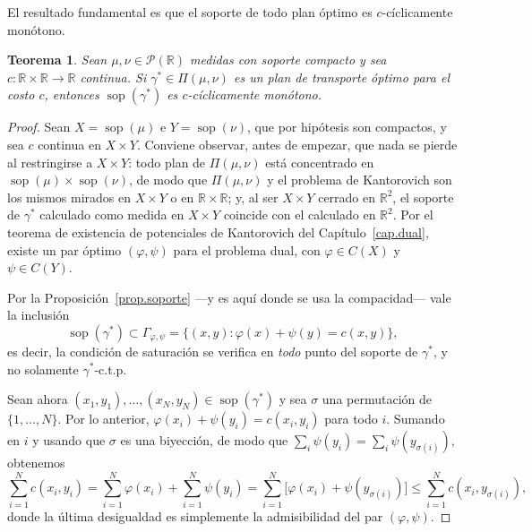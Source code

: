 \documentclass[12pt, a4paper]{amsbook}
\def\sop{\operatorname {\mathrm{sop}}}
\newcommand{\R}{{\mathbb R}}
\newtheorem{teo}{Teorema}[section]
\theoremstyle{remark}
\theoremstyle{definition}
\numberwithin{section}{chapter}
\numberwithin{subsection}{section}
\numberwithin{equation}{section}
\numberwithin{figure}{chapter}
\begin{document}
El resultado fundamental es que el soporte de todo plan óptimo es $c$-cíclicamente
monótono.

\begin{teo}\label{teo:cm}
Sean $\mu,\nu\in\mathcal P(\R)$ medidas con soporte compacto y sea
$c\colon\R\times\R\to\R$ continua. Si $\gamma^*\in\Pi(\mu,\nu)$ es un plan de
transporte óptimo para el costo $c$, entonces $\sop(\gamma^*)$ es
$c$-cíclicamente monótono.
\end{teo}
\begin{proof}
Sean $X=\sop(\mu)$ e $Y=\sop(\nu)$, que por hipótesis son compactos, y sea $c$
continua en $X\times Y$. Conviene observar, antes de empezar, que nada se
pierde al restringirse a $X\times Y$: todo plan de $\Pi(\mu,\nu)$ está
concentrado en $\sop(\mu)\times\sop(\nu)$, de modo que $\Pi(\mu,\nu)$ y el
problema de Kantorovich son los mismos mirados en $X\times Y$ o en
$\R\times\R$; y, al ser $X\times Y$ cerrado en $\R^2$, el soporte de
$\gamma^*$ calculado como medida en $X\times Y$ coincide con el calculado en
$\R^2$. Por el teorema de existencia de potenciales de Kantorovich
del Capítulo~\ref{cap.dual}, existe un par óptimo $(\varphi,\psi)$ para el problema
dual, con $\varphi\in C(X)$ y $\psi\in C(Y)$.

Por la Proposición~\ref{prop.soporte} —y es aquí donde se usa la compacidad— vale
la inclusión
\[
\sop(\gamma^*)\subset\Gamma_{\varphi,\psi}
=\{(x,y):\varphi(x)+\psi(y)=c(x,y)\},
\]
es decir, la condición de saturación se verifica en \emph{todo} punto del soporte de
$\gamma^*$, y no solamente $\gamma^*$-c.t.p.

Sean ahora $(x_1,y_1),\dots,(x_N,y_N)\in\sop(\gamma^*)$ y sea $\sigma$ una
permutación de $\{1,\dots,N\}$. Por lo anterior, $\varphi(x_i)+\psi(y_i)=c(x_i,y_i)$
para todo $i$. Sumando en $i$ y usando que $\sigma$ es una biyección, de modo que
$\sum_i\psi(y_i)=\sum_i\psi(y_{\sigma(i)})$, obtenemos
\[
\sum_{i=1}^N c(x_i,y_i)
=\sum_{i=1}^N\varphi(x_i)+\sum_{i=1}^N\psi(y_i)
=\sum_{i=1}^N\bigl[\varphi(x_i)+\psi(y_{\sigma(i)})\bigr]
\le\sum_{i=1}^N c(x_i,y_{\sigma(i)}),
\]
donde la última desigualdad es simplemente la admisibilidad del par
$(\varphi,\psi)$.
\end{proof}
\end{document}
